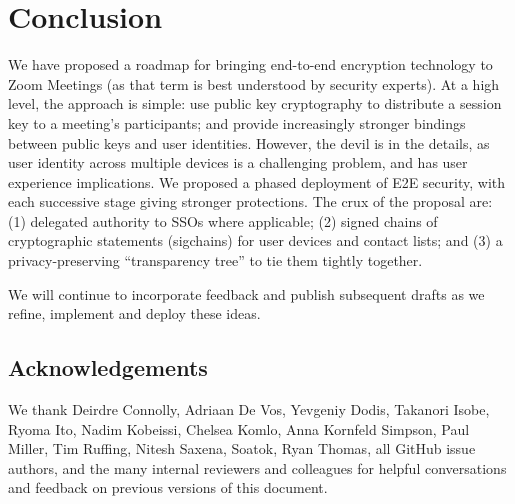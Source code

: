 \section{Conclusion}

We have proposed a roadmap for bringing end-to-end encryption technology to Zoom Meetings (as that
term is best understood by security experts). At a high level, the approach is simple: use public
key cryptography to distribute a session key to a meeting's participants; and provide increasingly
stronger bindings between public keys and user identities. However, the devil is in the details, as
user identity across multiple devices is a challenging problem, and has user experience
implications. We proposed a phased deployment of E2E security, with each successive stage giving
stronger protections. The crux of the proposal are: (1) delegated authority to SSOs where
applicable; (2) signed chains of cryptographic statements (sigchains) for user devices and contact
lists; and (3) a privacy-preserving ``transparency tree'' to tie them tightly together.

We will continue to incorporate feedback and publish subsequent drafts as we refine, implement and
deploy these ideas.

\subsection{Acknowledgements}
We thank Deirdre Connolly, Adriaan De Vos, Yevgeniy Dodis, Takanori Isobe, Ryoma Ito, Nadim
Kobeissi, Chelsea Komlo, Anna Kornfeld Simpson, Paul Miller, Tim Ruffing, Nitesh Saxena, Soatok,
Ryan Thomas, all GitHub issue authors, and the many internal reviewers and colleagues for helpful
conversations and feedback on previous versions of this document.